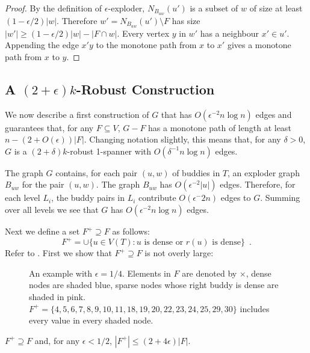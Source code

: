 \documentclass{patmorin}
\begin{document}
\begin{proof}
  By the definition of $\epsilon$-exploder, $N_{B_{uw}}(u')$ is a
  subset of $w$ of size at least $(1-\epsilon/2)|w|$. Therefore
  $w'=N_{B_{uw}}(u')\setminus F$ has size $|w'|\ge
  (1-\epsilon/2)|w|-|F\cap w|$.  Every vertex $y$ in $w'$ has a neighbour
  $x'\in u'$. Appending the edge $x'y$ to the monotone path from $x$
  to $x'$ gives a monotone path from $x$ to $y$.
\end{proof}
   
  
\subsection{A $(2+\epsilon)k$-Robust Construction}

We now describe a first construction of $G$ that has $O(\epsilon^{-2}n\log
n)$ edges and guarantees that, for any $F\subseteq V$,  $G-F$ has a
monotone path of length at least $n-(2+O(\epsilon))|F|$.  Changing
notation slightly, this means that, for any $\delta >0$, $G$ is a
$(2+\delta)k$-robust 1-spanner with $O(\delta^{-1}n\log n)$ edges.

The graph $G$ contains, for each pair $(u,w)$ of buddies in $T$, an
exploder graph $B_{uw}$ for the pair $(u,w)$.  The graph $B_{uw}$ has $O(\epsilon^{-2}|u|)$ edges. Therefore, for each level $L_i$, the buddy pairs in $L_i$ contribute $O(\epsilon^-2 n)$ edges to $G$.  Summing over all levels we see that $G$ has $O(\epsilon^{-2}n\log n)$ edges.

Next we define a set $F^+\supseteq F$ as follows: 
\[
  F^+ = \cup\{ u\in V(T): \text{$u$ is dense or $r(u)$ is dense}\} \enspace .
\]
Refer to .
First we show that $F^+\supseteq F$ is not overly large:

\begin{figure}
  \caption{An example with $\epsilon=1/4$.  Elements in $F$ are denoted by $\times$, dense nodes are shaded blue, sparse nodes whose right buddy is dense are shaded in pink. $F^+=\{4,5,6,7,8,9,10,11,18,19,20,22,23,24,25,29,30\}$ includes every value in every shaded node.}
\end{figure}

\begin{clm}
  $F^+\supseteq F$ and, for any $\epsilon < 1/2$, $|F^+|\le (2+4\epsilon)|F|$.
\end{clm}
\end{document}

